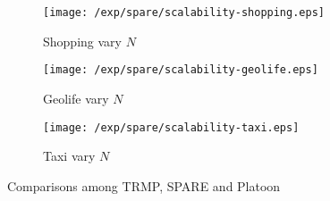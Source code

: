 \begin{figure*}[t]
\centering
\begin{subfigure}[b]{0.31\textwidth}
    \texttt{[image: /exp/spare/scalability-shopping.eps]}
        \caption{Shopping vary $N$}
    \end{subfigure}
 	 \begin{subfigure}[b]{0.31\textwidth}
        \texttt{[image: /exp/spare/scalability-geolife.eps]}
        \caption{Geolife vary $N$}
    \end{subfigure}
    	 \begin{subfigure}[b]{0.31\textwidth}
        \texttt{[image: /exp/spare/scalability-taxi.eps]}
        \caption{Taxi vary $N$}
    \end{subfigure}
 \caption{Comparisons among TRMP, SPARE and Platoon}
 \label{exp:scalability}
\end{figure*}